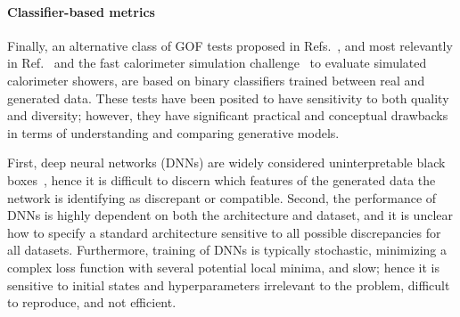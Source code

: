 \paragraph{Classifier-based metrics}

Finally, an alternative class of GOF tests proposed in Refs.~\cite{friedman_gof, lopez_paz_c2st, liu_deepkernels}, and most relevantly in Ref.~\cite{krause_caloflow} and the fast calorimeter simulation challenge~\cite{calochallenge} to evaluate simulated calorimeter showers, are based on binary classifiers trained between real and generated data.
These tests have been posited to have sensitivity to both quality and diversity; however, they have significant practical and conceptual drawbacks in terms of understanding and comparing generative models.

First, deep neural networks (DNNs) are widely considered uninterpretable black boxes~\cite{black_box}, hence it is difficult to discern which features of the generated data the network is identifying as discrepant or compatible.
Second, the performance of DNNs is highly dependent on both the architecture and dataset, and it is unclear how to specify a standard architecture sensitive to all possible discrepancies for all datasets.
Furthermore, training of DNNs is typically stochastic, minimizing a complex loss function with several potential local minima, and slow; hence it is sensitive to initial states and hyperparameters irrelevant to the problem, difficult to reproduce, and not efficient.

